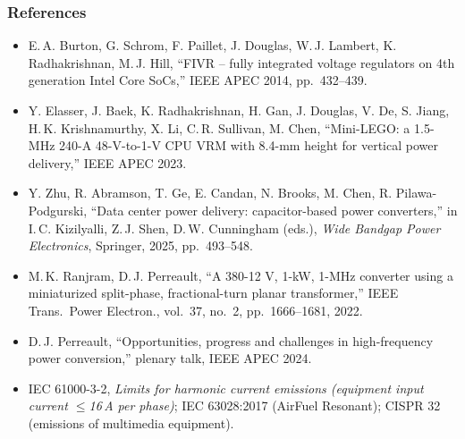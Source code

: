 \begin{frame}
	\frametitle{References}
	\scriptsize
	\begin{itemize}
		\item E.\,A. Burton, G. Schrom, F. Paillet, J. Douglas, W.\,J. Lambert, K. Radhakrishnan, M.\,J. Hill, ``FIVR -- fully integrated voltage regulators on 4th generation Intel Core SoCs,'' IEEE APEC 2014, pp.\ 432--439.
		\item Y. Elasser, J. Baek, K. Radhakrishnan, H. Gan, J. Douglas, V. De, S. Jiang, H.\,K. Krishnamurthy, X. Li, C.\,R. Sullivan, M. Chen, ``Mini-LEGO: a 1.5-MHz 240-A 48-V-to-1-V CPU VRM with 8.4-mm height for vertical power delivery,'' IEEE APEC 2023.
		\item Y. Zhu, R. Abramson, T. Ge, E. Candan, N. Brooks, M. Chen, R. Pilawa-Podgurski, ``Data center power delivery: capacitor-based power converters,'' in I.\,C. Kizilyalli, Z.\,J. Shen, D.\,W. Cunningham (eds.), \textit{Wide Bandgap Power Electronics}, Springer, 2025, pp.\ 493--548.
		\item M.\,K. Ranjram, D.\,J. Perreault, ``A 380-12 V, 1-kW, 1-MHz converter using a miniaturized split-phase, fractional-turn planar transformer,'' IEEE Trans.\ Power Electron., vol.\ 37, no.\ 2, pp.\ 1666--1681, 2022.
		\item D.\,J. Perreault, ``Opportunities, progress and challenges in high-frequency power conversion,'' plenary talk, IEEE APEC 2024.
		\item IEC 61000-3-2, \textit{Limits for harmonic current emissions (equipment input current $\leq$16\,A per phase)}; IEC 63028:2017 (AirFuel Resonant); CISPR 32 (emissions of multimedia equipment).
	\end{itemize}
\end{frame}
